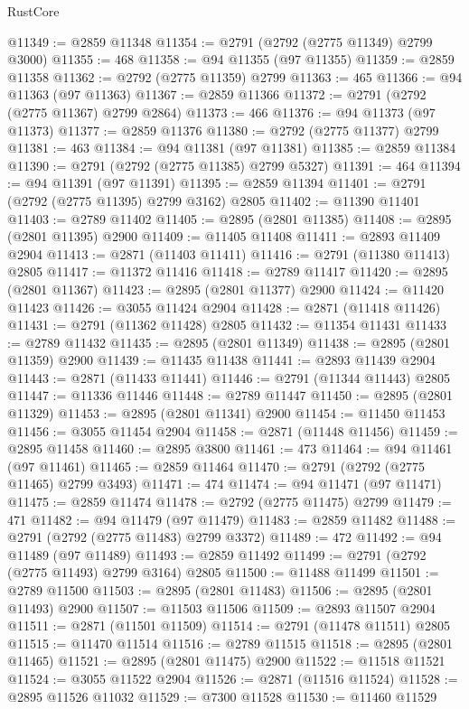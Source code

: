\begin{lexlean}{RustCore}
\begin{coremodule}
@11349 := @2859 @11348
@11354 := @2791 (@2792 (@2775 @11349) @2799 @3000)
@11355 := 468
@11358 := @94 @11355 (@97 @11355)
@11359 := @2859 @11358
@11362 := @2792 (@2775 @11359) @2799
@11363 := 465
@11366 := @94 @11363 (@97 @11363)
@11367 := @2859 @11366
@11372 := @2791 (@2792 (@2775 @11367) @2799 @2864)
@11373 := 466
@11376 := @94 @11373 (@97 @11373)
@11377 := @2859 @11376
@11380 := @2792 (@2775 @11377) @2799
@11381 := 463
@11384 := @94 @11381 (@97 @11381)
@11385 := @2859 @11384
@11390 := @2791 (@2792 (@2775 @11385) @2799 @5327)
@11391 := 464
@11394 := @94 @11391 (@97 @11391)
@11395 := @2859 @11394
@11401 := @2791 (@2792 (@2775 @11395) @2799 @3162) @2805
@11402 := @11390 @11401
@11403 := @2789 @11402
@11405 := @2895 (@2801 @11385)
@11408 := @2895 (@2801 @11395) @2900
@11409 := @11405 @11408
@11411 := @2893 @11409 @2904
@11413 := @2871 (@11403 @11411)
@11416 := @2791 (@11380 @11413) @2805
@11417 := @11372 @11416
@11418 := @2789 @11417
@11420 := @2895 (@2801 @11367)
@11423 := @2895 (@2801 @11377) @2900
@11424 := @11420 @11423
@11426 := @3055 @11424 @2904
@11428 := @2871 (@11418 @11426)
@11431 := @2791 (@11362 @11428) @2805
@11432 := @11354 @11431
@11433 := @2789 @11432
@11435 := @2895 (@2801 @11349)
@11438 := @2895 (@2801 @11359) @2900
@11439 := @11435 @11438
@11441 := @2893 @11439 @2904
@11443 := @2871 (@11433 @11441)
@11446 := @2791 (@11344 @11443) @2805
@11447 := @11336 @11446
@11448 := @2789 @11447
@11450 := @2895 (@2801 @11329)
@11453 := @2895 (@2801 @11341) @2900
@11454 := @11450 @11453
@11456 := @3055 @11454 @2904
@11458 := @2871 (@11448 @11456)
@11459 := @2895 @11458
@11460 := @2895 @3800
@11461 := 473
@11464 := @94 @11461 (@97 @11461)
@11465 := @2859 @11464
@11470 := @2791 (@2792 (@2775 @11465) @2799 @3493)
@11471 := 474
@11474 := @94 @11471 (@97 @11471)
@11475 := @2859 @11474
@11478 := @2792 (@2775 @11475) @2799
@11479 := 471
@11482 := @94 @11479 (@97 @11479)
@11483 := @2859 @11482
@11488 := @2791 (@2792 (@2775 @11483) @2799 @3372)
@11489 := 472
@11492 := @94 @11489 (@97 @11489)
@11493 := @2859 @11492
@11499 := @2791 (@2792 (@2775 @11493) @2799 @3164) @2805
@11500 := @11488 @11499
@11501 := @2789 @11500
@11503 := @2895 (@2801 @11483)
@11506 := @2895 (@2801 @11493) @2900
@11507 := @11503 @11506
@11509 := @2893 @11507 @2904
@11511 := @2871 (@11501 @11509)
@11514 := @2791 (@11478 @11511) @2805
@11515 := @11470 @11514
@11516 := @2789 @11515
@11518 := @2895 (@2801 @11465)
@11521 := @2895 (@2801 @11475) @2900
@11522 := @11518 @11521
@11524 := @3055 @11522 @2904
@11526 := @2871 (@11516 @11524)
@11528 := @2895 @11526 @11032
@11529 := @7300 @11528
@11530 := @11460 @11529

\end{coremodule}
\end{lexlean}
